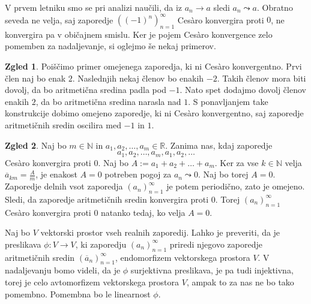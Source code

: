 \documentclass[a4paper,12pt]{article}
\theoremstyle{definition}
\newtheorem{zgled}{Zgled}
\theoremstyle{plain}
\begin{document}
V prvem letniku smo se pri analizi naučili, da iz $a_n \rightarrow a$ sledi $a_n \leadsto a$. Obratno seveda ne velja, saj zaporedje $\left( (-1)^n \right)_{n=1}^{\infty}$ Ces\`{a}ro konvergira proti $0$, ne konvergira pa v običajnem smislu. Ker je pojem Ces\`{a}ro konvergence zelo pomemben za nadaljevanje, si oglejmo še nekaj primerov.

\begin{zgled}
    Poiščimo primer omejenega zaporedja, ki ni Ces\`{a}ro konvergentno. Prvi člen naj bo enak $2$. Naslednjih nekaj členov bo enakih $-2$. Takih členov mora biti dovolj, da bo aritmetična sredina padla pod $-1$. Nato spet dodajmo dovolj členov enakih $2$, da bo aritmetična sredina narasla nad $1$. S ponavljanjem take konstrukcije dobimo omejeno zaporedje, ki ni Ces\`{a}ro konvergentno, saj zaporedje aritmetičnih sredin oscilira med $-1$ in $1$.
\end{zgled}

\begin{zgled}
    Naj bo $m \in \mathbb{N}$ in $a_1, a_2, \ldots, a_m \in \mathbb{R}$. Zanima nas, kdaj zaporedje 
    $$a_1, a_2, \ldots, a_m, a_1, a_2, \ldots$$ 
    Ces\`{a}ro konvergira proti $0$. Naj bo $A := a_1 + a_2 + \ldots + a_m$. Ker za vse $k \in \mathbb{N}$ velja $\overline{a}_{km} = \frac{A}{m}$, je enakost $A = 0$ potreben pogoj za $a_n \leadsto 0$. Naj bo torej $A = 0$. Zaporedje delnih vsot zaporedja $(a_n)_{n=1}^{\infty}$ je potem periodično, zato je omejeno. Sledi, da zaporedje aritmetičnih sredin konvergira proti $0$. Torej $(a_n)_{n=1}^{\infty}$ Ces\`{a}ro konvergira proti $0$ natanko tedaj, ko velja $A = 0$.
\end{zgled}

Naj bo $V$ vektorski prostor vseh realnih zaporedij. Lahko je preveriti, da je preslikava $\phi: V \rightarrow V$, ki zaporedju $(a_n)_{n=1}^{\infty}$ priredi njegovo zaporedje aritmetičnih sredin $(\overline{a}_n)_{n=1}^{\infty}$, endomorfizem vektorskega prostora $V$. V nadaljevanju bomo videli, da je $\phi$ surjektivna preslikava, je pa tudi injektivna, torej je celo avtomorfizem vektorskega prostora $V$, ampak to za nas ne bo tako pomembno. Pomembna bo le linearnost $\phi$. 
\end{document}
